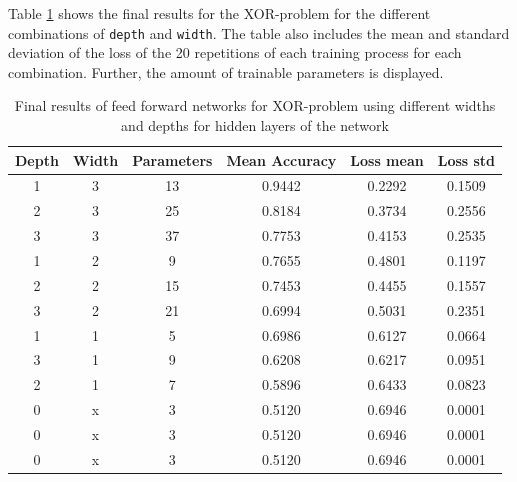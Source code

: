 Table \ref{tab:xor} shows the final results for the XOR-problem for the different combinations of \lstinline|depth| and \lstinline|width|. The table also includes the mean and standard deviation of the loss of the 20 repetitions of each training process for each combination. Further, the amount of trainable parameters is displayed.
\begin{table}[!htb]
\centering
\begin{tabular}{|c|c|c|c|c|c|}
\hline
\textbf{Depth} & \textbf{Width} & \textbf{Parameters} & \textbf{Mean Accuracy} & \textbf{Loss mean} & \textbf{Loss std} \\ \hline
1              & 3              & 13                  & 0.9442            & 0.2292             & 0.1509            \\ \hline
2              & 3              & 25                  & 0.8184            & 0.3734             & 0.2556            \\ \hline
3              & 3              & 37                  & 0.7753            & 0.4153             & 0.2535            \\ \hline
1              & 2              & 9                   & 0.7655            & 0.4801             & 0.1197            \\ \hline
2              & 2              & 15                  & 0.7453            & 0.4455             & 0.1557            \\ \hline
3              & 2              & 21                  & 0.6994            & 0.5031             & 0.2351            \\ \hline
1              & 1              & 5                   & 0.6986            & 0.6127             & 0.0664            \\ \hline
3              & 1              & 9                   & 0.6208            & 0.6217             & 0.0951            \\ \hline
2              & 1              & 7                   & 0.5896            & 0.6433             & 0.0823            \\ \hline
0              & x              & 3                   & 0.5120            & 0.6946             & 0.0001            \\ \hline
0              & x              & 3                   & 0.5120            & 0.6946             & 0.0001            \\ \hline
0              & x              & 3                   & 0.5120            & 0.6946             & 0.0001            \\ \hline
\end{tabular}
\caption{Final results of feed forward networks for XOR-problem using different widths and depths for hidden layers of the network}
\label{tab:xor}
\end{table}

